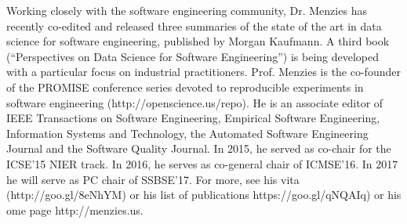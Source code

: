 \documentclass{sig-alternate}
\begin{document}
Working closely with the software engineering community, Dr. Menzies has recently co-edited and released three summaries of the state of the art in data science for software engineering, published by Morgan Kaufmann. A third book (``Perspectives on Data Science for Software Engineering'') is being developed with a particular focus on industrial practitioners.  
Prof. Menzies is the co-founder of the PROMISE conference  series devoted to reproducible experiments in software engineering  (http://openscience.us/repo). He is an associate editor of IEEE Transactions on Software Engineering, Empirical Software Engineering, Information Systems and Technology, the Automated Software Engineering Journal and the Software Quality Journal. In 2015, he served as co-chair for the ICSE'15 NIER track. In 2016, he serves as co-general chair of ICMSE'16. In 2017 he will serve as PC chair of SSBSE’17. For more, see his vita (http://goo.gl/8eNhYM) or his list of
publications https://goo.gl/qNQAIq) or his ome page
http://menzies.us.
 
\end{document}

